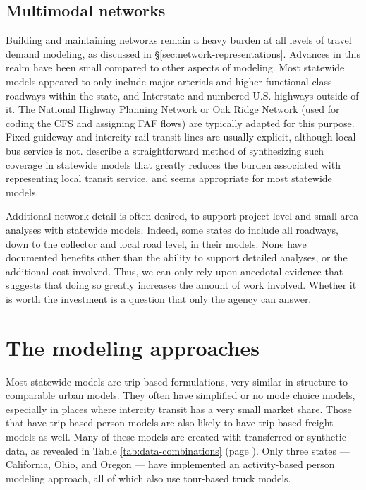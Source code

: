 \subsection{Multimodal networks}

Building and maintaining networks remain a heavy burden at all levels of travel demand modeling, as discussed in \S\ref{sec:network-representations}. Advances in this realm have been small compared to other aspects of modeling. Most statewide models appeared to only include major arterials and higher functional class roadways within the state, and Interstate and numbered U.S. highways outside of it. The National Highway Planning Network or Oak Ridge Network (used for coding the CFS and assigning FAF flows) are typically adapted for this purpose. Fixed guideway and intercity rail transit lines are usually explicit, although local bus service is not. \cite{circella13} describe a straightforward method of synthesizing such coverage in statewide models that greatly reduces the burden associated with representing local transit service, and seems appropriate for most statewide models.

Additional network detail is often desired, to support project-level and small area analyses with statewide models. Indeed, some states do include all roadways, down to the collector and local road level, in their models. None have documented benefits other than the ability to support detailed analyses, or the additional cost involved. Thus, we can only rely upon anecdotal evidence that suggests that doing so greatly increases the amount of work involved. Whether it is worth the investment is a question that only the agency can answer.

\section{The modeling approaches}

Most statewide models are trip-based formulations, very similar in structure to comparable urban models. They often have simplified or no mode choice models, especially in places where intercity transit has a very small market share. Those that have trip-based person models are also likely to have trip-based freight models as well. Many of these models are created with transferred or synthetic data, as revealed in Table \ref{tab:data-combinations} (page \pageref{tab:data-combinations}). Only three states --- California, Ohio, and Oregon --- have implemented an activity-based person modeling approach, all of which also use tour-based truck models.

